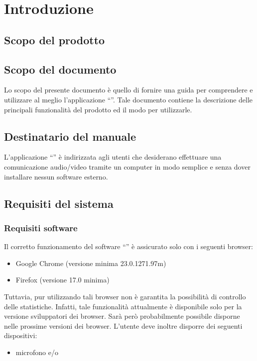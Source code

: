 


\setcounter{page}{1}
\pagestyle{normal}

\section{Introduzione}
\subsection{Scopo del prodotto}
\purpose

\subsection{Scopo del documento}
Lo scopo del presente documento è quello di fornire una guida per comprendere e utilizzare al meglio l'applicazione ``\caName''.
Tale documento contiene la descrizione delle principali funzionalità del prodotto ed il modo
per utilizzarle.


\subsection{Destinatario del manuale}
L'applicazione  ``\caName'' è indirizzata agli utenti che desiderano effettuare una comunicazione audio/video tramite un computer in modo semplice  e senza dover installare nessun software esterno.  

\subsection{Requisiti del sistema}
\subsubsection{Requisiti software}
Il corretto funzionamento del software  ``\caName'' è assicurato solo con i seguenti browser:
\begin{itemize}
  \item Google Chrome (versione minima 23.0.1271.97m)
  \item Firefox (versione 17.0 minima)
\end{itemize}

Tuttavia, pur utilizzando tali browser non è garantita la possibilità di controllo delle statistiche. Infatti, tale funzionalità attualmente è disponibile solo per la versione sviluppatori dei browser. Sarà però probabilmente possibile disporne nelle prossime versioni dei browser.
L'utente deve inoltre disporre dei seguenti dispositivi:
\begin{itemize}
  \item microfono e/o  
 \end{itemize}
 
